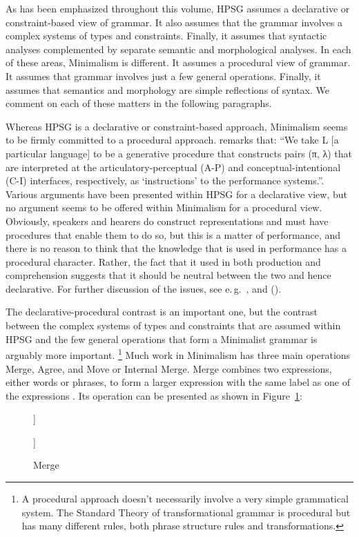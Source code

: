 \documentclass[output=paper]{langsci/langscibook}
\begin{document}
As has been emphasized throughout this volume, HPSG assumes a declarative or constraint-based view of grammar. It also assumes that the grammar involves a complex systems of types and constraints. Finally, it assumes that syntactic analyses complemented by separate semantic and morphological analyses. In each of these areas, Minimalism is different. It assumes a procedural view of grammar. It assumes that grammar involves just a few general operations. Finally, it assumes that semantics and morphology are simple reflections of syntax. We comment on each of these matters in the following paragraphs.

Whereas HPSG is a declarative or constraint-based approach, Minimalism seems to be firmly committed
to a procedural approach. \citet[219]{Chomsky95a-u} remarks that: ``We take L [a particular language]
to be a generative procedure that constructs pairs (π, λ) that are interpreted at the
articulatory-perceptual (A-P) and conceptual-intentional (C-I) interfaces, respectively, as
`instructions' to the performance systems.''. Various arguments have been presented within HPSG for
a declarative view, but no argument seems to be offered within Minimalism for a procedural
view. Obviously, speakers and hearers do construct representations and must have procedures that
enable them to do so, but this is a matter of performance, and there is no reason to think that the
knowledge that is used in performance has a procedural character. Rather, the fact that it used in
both production and comprehension suggests that it should be neutral between the two and hence
declarative. For further discussion of the issues, see e.\,g.\ \citet{PS2001a}, \citet{Postal2003a}
and \citeauthor{SW2011a} (\citeyear{SW2011a,SW2015a}).

The declarative-procedural contrast is an important one, but the contrast between the complex systems of types and constraints that are assumed within HPSG and the few general operations that form a Minimalist grammar is arguably more important.%
	\footnote{A procedural approach doesn't necessarily involve a very simple grammatical system. The Standard Theory of transformational grammar \citep{Chomsky65a} is procedural but has many different rules, both phrase structure rules and transformations.}
Much work in Minimalism has three main operations Merge, Agree, and Move or Internal Merge. Merge
combines two expressions, either words or phrases, to form a larger expression with the same label
as one of the expressions \citep[244]{Chomsky95a-u}. Its operation can be presented as shown in Figure~\ref{fig:min-merge}:
\begin{figure}
\centering
	\raisebox{1\baselineskip}{X, Y $\Rightarrow$}
	\hspace{1em}
	\begin{forest}
		[X [X] [Y]]
	\end{forest}
\hspace{1em}
\raisebox{1\baselineskip}{or}
\hspace{1em}
	\begin{forest}
		[Y [X] [Y]]
	\end{forest}
	\caption{\label{fig:min-merge}Merge}
\end{figure}
\end{document}
